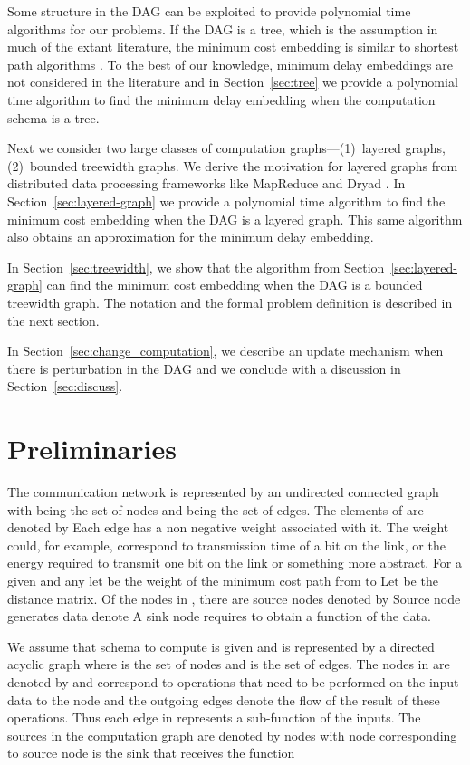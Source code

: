 \documentclass[journal]{IEEEtran}
\begin{document}
Some structure in the DAG can be exploited to provide polynomial time
algorithms for our problems. If the DAG is a tree, which is the
assumption in much of the extant literature, the minimum cost
embedding is similar to shortest path algorithms
\cite{Ying08,Shah13}. To the best of our knowledge, minimum delay
embeddings are not considered in the literature and in
Section~\ref{sec:tree} we provide a polynomial time algorithm to find
the minimum delay embedding when the computation schema is a tree.

Next we consider two large classes of computation graphs---(1)~layered
graphs, (2)~bounded treewidth graphs. We derive the motivation for
layered graphs from distributed data processing frameworks like
MapReduce \cite{Dean04} and Dryad \cite{Isard07}.  In
Section~\ref{sec:layered-graph} we provide a polynomial time algorithm
to find the minimum cost embedding when the DAG is a layered
graph. This same algorithm also obtains an approximation for the
minimum delay embedding.

In Section~\ref{sec:treewidth}, we show that the algorithm from
Section~\ref{sec:layered-graph} can find the minimum cost embedding
when the DAG is a bounded treewidth graph.  
The notation and the
formal problem definition is described in the next section.

In Section~\ref{sec:change_computation}, we describe an update
mechanism when there is perturbation in the DAG and we conclude with a
discussion in Section~\ref{sec:discuss}.

\section{Preliminaries}
\label{sec:prelims}

The communication network is represented by an undirected connected
graph  with  being the set of
 nodes and  being the set of  edges. The elements of
 are denoted by  Each edge
 has a non negative weight 
associated with it. The weight could, for example, correspond to
transmission time of a bit on the link, or the energy required to
transmit one bit on the link or something more abstract.  For a given
 and any  let  be the
weight of the minimum cost path from  to  Let  be the  distance matrix.  Of the
 nodes in , there are  source nodes denoted by  Source node  generates data
 denote  A sink node 
requires to obtain a function  of the data.

We assume that schema to compute  is given
and is represented by a directed acyclic graph  where  is the set of  nodes
and  is the set of  edges. The nodes in 
are denoted by  and correspond to
operations that need to be performed on the input data to the node and
the outgoing edges denote the flow of the result of these
operations. Thus each edge in  represents a sub-function
of the inputs. The sources in the computation graph are denoted by
nodes  with node 
corresponding to source  node  is the sink that
receives the function 
\end{document}
